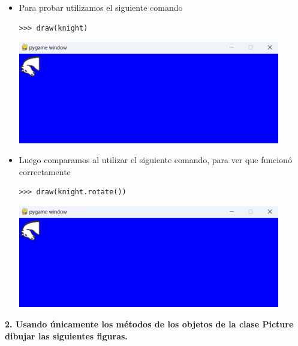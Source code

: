 \documentclass{article}
\begin{document}
\begin{itemize}
    \begin{itemize}
      \item Para probar utilizamos el siguiente comando

      \begin{lstlisting}[style=shell]
      >>> draw(knight)
      \end{lstlisting}
      \begin{minipage}{\linewidth}
        \centering
        \includegraphics[width=0.9\textwidth]{imagenes/p_rotate2.png}
      \end{minipage}

      \vspace{2\baselineskip}

      \item Luego comparamos al utilizar el siguiente comando, para ver que funcionó correctamente
      \begin{lstlisting}[style=shell]
      >>> draw(knight.rotate())
      \end{lstlisting}
      \begin{minipage}{\linewidth}
        \centering
        \includegraphics[width=0.9\textwidth]{imagenes/p_rotate2.png}
      \end{minipage}
    \end{itemize}
  
  \end{itemize}

  \pagebreak
  
  \textbf{2. Usando únicamente los métodos de los objetos de la clase Picture dibujar las siguientes figuras.}
\end{document}
